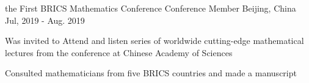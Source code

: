 \begin{cventries}

   \cventry
    {the First BRICS Mathematics Conference} %
    {Conference Member} %
    {Beijing, China} %
    {Jul, 2019 - Aug. 2019} %
    {
      \begin{cvitems} %
        \item {Was invited to Attend and listen series of worldwide cutting-edge mathematical lectures from the conference at Chinese Academy of Sciences}
        \item {Consulted mathematicians from five BRICS countries and made a manuscript}
      \end{cvitems}
    }
    
    
\end{cventries}
